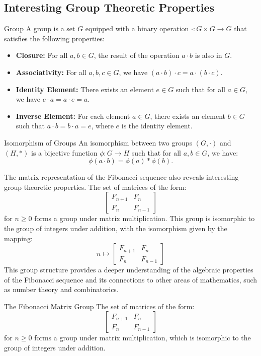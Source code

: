 \documentclass[openany]{book}
\begin{document}
\subsection{Interesting Group Theoretic Properties}
\begin{mydefinition}{Group}
    A group is a set $G$ equipped with a binary operation $\cdot : G \times G \to G$ that satisfies the following properties:
    \begin{itemize}
        \item \textbf{Closure:} For all $a, b \in G$, the result of the operation $a \cdot b$ is also in $G$.
        \item \textbf{Associativity:} For all $a, b, c \in G$, we have $(a \cdot b) \cdot c = a \cdot (b \cdot c)$.
        \item \textbf{Identity Element:} There exists an element $e \in G$ such that for all $a \in G$, we have $e \cdot a = a \cdot e = a$.
        \item \textbf{Inverse Element:} For each element $a \in G$, there exists an element $b \in G$ such that $a \cdot b = b \cdot a = e$, where $e$ is the identity element.
    \end{itemize}
\end{mydefinition}
\begin{mydefinition}{Isomorphism of Groups}
    An isomorphism between two groups $(G, \cdot)$ and $(H, *)$ is a bijective function $\phi : G \to H$ such that for all $a, b \in G$, we have:
    \[
        \phi(a \cdot b) = \phi(a) * \phi(b).
    \]
\end{mydefinition}
The matrix representation of the Fibonacci sequence also reveals interesting group theoretic properties. The set of matrices of the form:
\[
    \begin{bmatrix}F_{n+1} & F_n \\ F_n & F_{n-1} \end{bmatrix}
\]
for $n \geq 0$ forms a group under matrix multiplication. This group is isomorphic to the group of integers under addition, with the isomorphism given by the mapping:
\[
    n \mapsto \begin{bmatrix}F_{n+1} & F_n \\ F_n & F_{n-1} \end{bmatrix}
\]
This group structure provides a deeper understanding of the algebraic properties of the Fibonacci sequence and its connections to other areas of mathematics, such as number theory and combinatorics.
\begin{mytheorem}{The Fibonacci Matrix Group}
    The set of matrices of the form:
    \[
        \begin{bmatrix}F_{n+1} & F_n \\ F_n & F_{n-1} \end{bmatrix}
    \]
    for $n \geq 0$ forms a group under matrix multiplication, which is isomorphic to the group of integers under addition.
\end{mytheorem}
\end{document}
